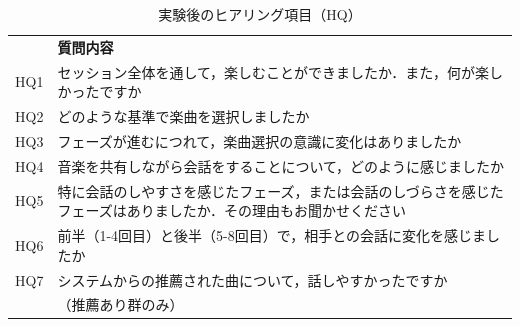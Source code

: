 \begin{table}[H]
  \caption{実験後のヒアリング項目（HQ）}
  \label{実験後のヒアリング項目}
  \centering
  \begin{tabular}{|l|p{}|}
    \hline
     & \textbf{質問内容} \\
    \hhline{|=|=|}
    HQ1 & セッション全体を通して，楽しむことができましたか．また，何が楽しかったですか \\
    \hline
    HQ2 & どのような基準で楽曲を選択しましたか \\
    \hline
    HQ3 & フェーズが進むにつれて，楽曲選択の意識に変化はありましたか \\
    \hline
    HQ4 & 音楽を共有しながら会話をすることについて，どのように感じましたか \\
    \hline
    HQ5 & 特に会話のしやすさを感じたフェーズ，または会話のしづらさを感じたフェーズはありましたか．その理由もお聞かせください \\
    \hline
    HQ6 & 前半（1-4回目）と後半（5-8回目）で，相手との会話に変化を感じましたか \\
    \hline
    HQ7 & システムからの推薦された曲について，話しやすかったですか \\
       &（推薦あり群のみ）\\
    \hline
  \end{tabular}
\end{table}
